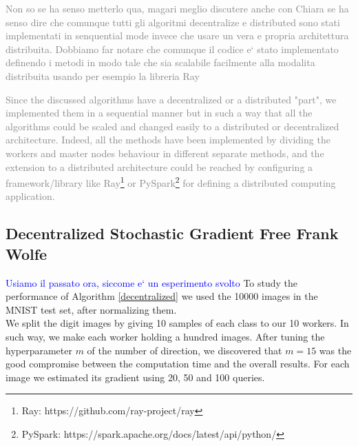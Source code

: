\textcolor{gray}{Non so se ha senso metterlo qua, magari meglio discutere anche con Chiara se ha senso dire che comunque tutti gli algoritmi decentralize e distributed sono stati implementati in senquential mode invece che usare un vera e propria architettura distribuita. Dobbiamo far notare che comunque il codice e` stato implementato definendo i metodi in modo tale che sia scalabile facilmente alla modalita distribuita usando per esempio la libreria Ray}

\textcolor{gray}{Since the discussed algorithms have a decentralized or a distributed "part", we implemented them in a sequential manner but in such a way that all the algorithms could be scaled and changed easily to a distributed or decentralized architecture. Indeed, all the methods have been implemented by dividing the workers and master nodes behaviour in different separate methods, and the extension to a distributed architecture could be reached by configuring a framework/library like Ray\footnote{Ray: https://github.com/ray-project/ray} or PySpark\footnote{PySpark: https://spark.apache.org/docs/latest/api/python/} for defining a distributed computing application.}

\subsection{Decentralized Stochastic Gradient Free Frank Wolfe}
\textcolor{blue}{Usiamo il passato ora, siccome e` un esperimento svolto}
To study the performance of Algorithm \ref{decentralized} we used the 10000 images in the MNIST test set, after normalizing them.\\ We split the digit images by giving 10 samples of each class to our 10 workers. In such way, we make each worker holding a hundred images. After tuning the hyperparameter $m$ of the number of direction, we discovered that $m=15$ was the good compromise between the computation time and the overall results. For each image we estimated its gradient using 20, 50 and 100 queries.

